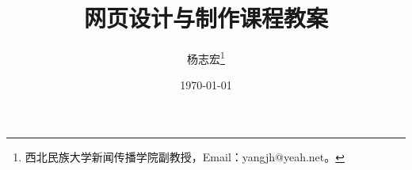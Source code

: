 \documentclass[oneside,UTF8,zihao=-4]{ctexbook}
\begin{document}
\frontmatter %

\title{网页设计与制作课程教案}
\author{杨志宏\thanks{西北民族大学新闻传播学院副教授，Email：yangjh@yeah.net。}}
\date{\today}

\maketitle

\tableofcontents

\mainmatter %






% 

\appendix




\backmatter

\end{document}
